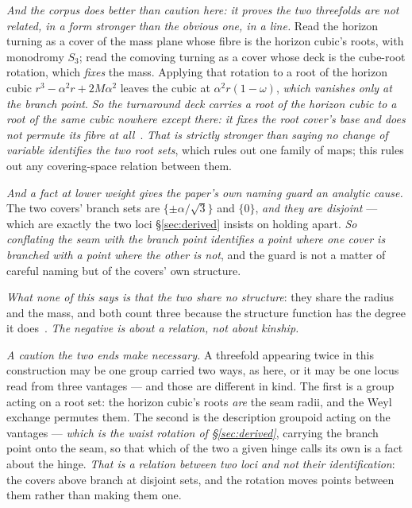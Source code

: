 \documentclass[11pt,a4paper]{article}
\theoremstyle{plain}
\theoremstyle{definition}
\begin{document}
\emph{And the corpus does better than caution here: it proves the two threefolds are not related, in a form
stronger than the obvious one, in a line.} Read the horizon turning as a cover of the mass plane whose fibre
is the horizon cubic's roots, with monodromy $S_{3}$; read the comoving turning as a cover whose deck is the
cube-root rotation, which \emph{fixes} the mass. Applying that rotation to a root of the horizon cubic
$r^{3}-\alpha^{2}r+2M\alpha^{2}$ leaves the cubic at $\alpha^{2}r(1-\omega)$, \emph{which vanishes only at the branch point}. \emph{So the turnaround deck carries a
root of the horizon cubic to a root of the same cubic nowhere except there: it fixes the root cover's base
and does not permute its fibre at all}~\cite{JanzenCRframework}. \emph{That is strictly stronger than saying
no change of variable identifies the two root sets}, which rules out one family of maps; this rules out any
covering-space relation between them.

\emph{And a fact at lower weight gives the paper's own naming guard an analytic cause.} The two covers'
branch sets are $\{\pm\alpha/\sqrt3\}$ and $\{0\}$, \emph{and they are disjoint} --- which are exactly the
two loci \S\ref{sec:derived} insists on holding apart. \emph{So conflating the seam with the branch point
identifies a point where one cover is branched with a point where the other is not}, and the guard is not a
matter of careful naming but of the covers' own structure.

\emph{What none of this says is that the two share no structure}: they share the radius and the mass, and
both count three because the structure function has the degree it does~\cite{JanzenCRframework}. \emph{The
negative is about a relation, not about kinship.}

\emph{A caution the two ends make necessary.} A threefold appearing twice in this construction may be one
group carried two ways, as here, or it may be one locus read from three vantages --- and those are different
in kind. The first is a group acting on a root set: the horizon cubic's roots \emph{are}
the seam radii, and the Weyl exchange permutes them. The second is the description groupoid acting on the
vantages --- \emph{which is the waist rotation of \S\ref{sec:derived}}, carrying the branch point onto the
seam, so that which of the two a given hinge calls its own is a fact about the hinge. \emph{That is a
relation between two loci and not their identification}: the covers above branch at disjoint sets, and the
rotation moves points between them rather than making them one.
\end{document}
